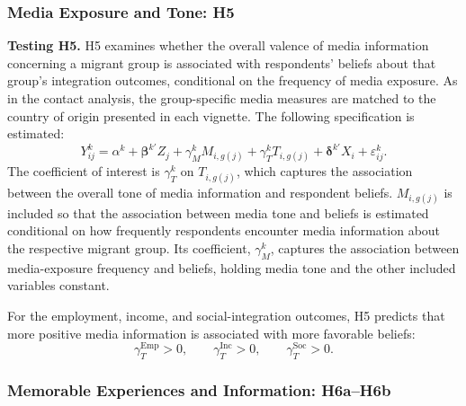 \subsubsection{Media Exposure and Tone: H5}

\noindent\textbf{Testing H5.} H5 examines whether the overall valence of media information concerning a migrant group 
is associated with respondents' beliefs about that group's integration outcomes, conditional on the frequency of media 
exposure. As in the contact analysis, the group-specific media measures are matched to the country of origin presented 
in each vignette. The following specification is estimated:
\begin{equation}
Y_{ij}^{k}
=
\alpha^{k}
+ \boldsymbol{\beta}^{k\prime}Z_j
+ \gamma_M^{k}M_{i,g(j)}
+ \gamma_T^{k}T_{i,g(j)}
+ \boldsymbol{\delta}^{k\prime}X_i
+ \varepsilon_{ij}^{k}.
\end{equation}
The coefficient of interest is \(\gamma_T^{k}\) on \(T_{i,g(j)}\), which captures the association between the overall 
tone of media information and respondent beliefs. \(M_{i,g(j)}\) is included so that the association between media tone 
and beliefs is estimated conditional on how frequently respondents encounter media information about the respective 
migrant group. Its coefficient, \(\gamma_M^k\), captures the association between media-exposure frequency and beliefs, 
holding media tone and the other included variables constant.

For the employment, income, and social-integration outcomes, H5 predicts that more positive media information is 
associated with more favorable beliefs:
\[
\gamma_T^{\mathrm{Emp}}>0,\qquad
\gamma_T^{\mathrm{Inc}}>0,\qquad
\gamma_T^{\mathrm{Soc}}>0.
\]

\subsubsection{Memorable Experiences and Information: H6a–H6b}

